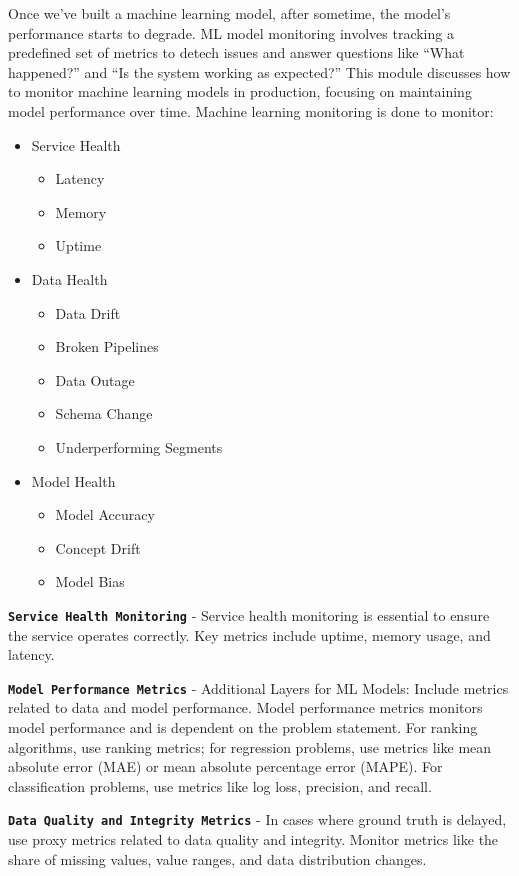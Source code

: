 \documentclass[letterpaper,12pt,notitlepage,twoside]{report}
\begin{document}
Once we've built a machine learning model, after sometime, the model's performance starts to degrade.  ML model monitoring involves tracking a predefined set of metrics to detech issues and answer questions like ``What happened?'' and ``Is the system working as expected?'' This module discusses how to monitor machine learning models in production, focusing on maintaining model performance over time. Machine learning monitoring is done to monitor:
\begin{itemize}[noitemsep, topsep=0pt]
\item Service Health
	\begin{itemize}
		\item Latency
		\item Memory
		\item Uptime
	\end{itemize}
\item Data Health
	\begin{itemize}
		\item Data Drift
		\item Broken Pipelines
		\item Data Outage
		\item Schema Change
		\item Underperforming Segments
	\end{itemize}
\item Model Health
	\begin{itemize}
		\item Model Accuracy
		\item Concept Drift
		\item Model Bias
	\end{itemize}
\end{itemize}

\texttt{\textbf{Service Health Monitoring}} - Service health monitoring is essential to ensure the service operates correctly. Key metrics include uptime, memory usage, and latency.

\texttt{\textbf{Model Performance Metrics}} - Additional Layers for ML Models: Include metrics related to data and model performance. Model performance metrics monitors model performance and is dependent on the problem statement. For ranking algorithms, use ranking metrics; for regression problems, use metrics like mean absolute error (MAE) or mean absolute percentage error (MAPE). For classification problems, use metrics like log loss, precision, and recall.

\texttt{\textbf{Data Quality and Integrity Metrics}} -  In cases where ground truth is delayed, use proxy metrics related to data quality and integrity.  Monitor metrics like the share of missing values, value ranges, and data distribution changes.
\end{document}
